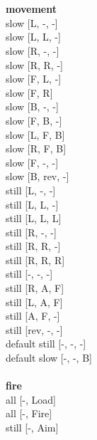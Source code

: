  
\ \\



\ \\ {\bf movement } \\
slow [L, -, -] \\
slow [L, L, -] \\
slow [R, -, -] \\
slow [R, R, -] \\
slow [F, L, -] \\
slow [F, R] \\
slow [B, -, -] \\
slow [F, B, -] \\
slow [L, F, B] \\
slow [R, F, B] \\
slow [F, -, -] \\
slow [B, rev, -] \\
still [L, -, -] \\
still [L, L, -] \\
still [L, L, L] \\
still [R, -, -] \\
still [R, R, -] \\
still [R, R, R] \\
still [-, -, -] \\
still [R, A, F] \\
still [L, A, F] \\
still [A, F, -] \\
still [rev, -, -] \\
default still [-, -, -] \\
default slow [-, -, B] \\
\ \\ {\bf fire } \\
all [-, Load] \\
all [-, Fire] \\
still [-, Aim] \\


